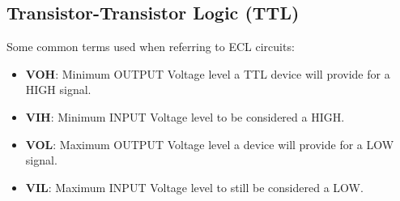\subsection{Transistor-Transistor Logic (TTL)}

Some common terms used when referring to ECL circuits:
\begin{itemize}
\item \textbf{VOH}: Minimum OUTPUT Voltage level a TTL device will provide for a
  HIGH signal.
\item \textbf{VIH}: Minimum INPUT Voltage level to be considered a HIGH.
\item \textbf{VOL}: Maximum OUTPUT Voltage level a device will provide for a LOW
  signal.
\item \textbf{VIL}: Maximum INPUT Voltage level to still be considered a LOW.
\end{itemize}

